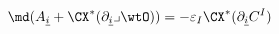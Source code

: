 \begin{equation}
 \md(A_{\underline{i}}+
 \CX^\ast(\partial_{\underline{i}}\lrcorner\wtO))= -\varepsilon_I
 \CX^*(\partial_{\underline{i}} C^I)
\end{equation}

